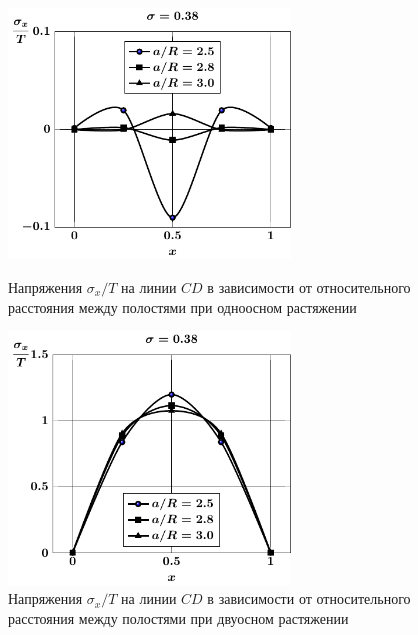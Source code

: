 \begin{russian}
\begin{figure}[h!]
\centering\footnotesize
\parbox[b]{7.5cm}{\centering\includegraphics[width=7.5cm]{spheres-cav13-a-t1-sig_x-cd.pdf}
\caption{Напряжения $\sigma_x/T$ на линии $CD$ в зависимости от относительного расстояния между полостями при одноосном растяжении
\label{f:8:44}}}\hfil\hfil
\parbox[b]{7.5cm}{\centering\includegraphics[width=7.5cm]{spheres-cav13-a-t2-sig_x-cd.pdf}
\caption{Напряжения $\sigma_x/T$ на линии $CD$ в зависимости от относительного расстояния между полостями при двуосном растяжении
\label{f:8:45}}}
\end{figure}


\end{russian}
